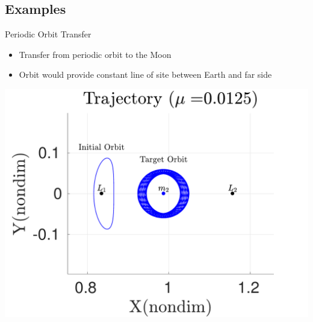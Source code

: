 \subsection{Examples}
\begin{frame}{Periodic Orbit Transfer}
    \begin{itemize}
        \item Transfer from periodic orbit to the Moon
        \item Orbit would provide constant line of site between Earth and far side
    \end{itemize}
    \begin{center}
        \includegraphics[height=0.75\textheight,keepaspectratio]{figures/2017_JAS/moon_orbit.pdf} %
   \end{center}
\end{frame}

